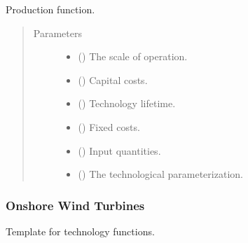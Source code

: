 \documentclass[letterpaper,10pt,english]{sphinxmanual}
\begin{document}

\begin{fulllineitems}
\label{\detokenize{technology:technology.simple_electrolysis.production}}
Production function.
\begin{quote}\begin{description}
\item[{Parameters}] \leavevmode\begin{itemize}
\item {} 
 () \textendash{} The scale of operation.

\item {} 
 () \textendash{} Capital costs.

\item {} 
 () \textendash{} Technology lifetime.

\item {} 
 () \textendash{} Fixed costs.

\item {} 
 () \textendash{} Input quantities.

\item {} 
 () \textendash{} The technological parameterization.

\end{itemize}

\end{description}\end{quote}

\end{fulllineitems}



\subsubsection{Onshore Wind Turbines}
\label{\detokenize{technology:module-technology.tutorial_basic}}\label{\detokenize{technology:onshore-wind-turbines}}
Template for technology functions.
\end{document}
